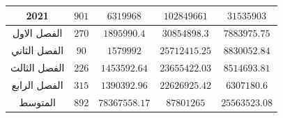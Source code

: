 \documentclass[10pt,a4paper]{report}
\begin{document}
\begin{longtable}{|c|c|c|c|c|}
2021         & $901$            & $6319968$        & $102849661$    & $31535903$         \\ \hline
الفصل الاول  & $270$            & $1895990.4$      & $30854898.3$   & $7883975.75$       \\ \hline
الفصل الثاني & $90$             & $1579992$        & $25712415.25$  & $8830052.84$       \\ \hline
الفصل الثالث & $226$            & $1453592.64$     & $23655422.03$  & $8514693.81$       \\ \hline
الفصل الرابع & $315$            & $1390392.96$     & $22626925.42$  & $6307180.6$        \\ \hline
\rowcolor[HTML]{DAE8FC} 
المتوسط      & $892$            & $78367558.17$    & $87801265$     & $25563523.08$      \\ \hline
\end{longtable}
\end{document}
